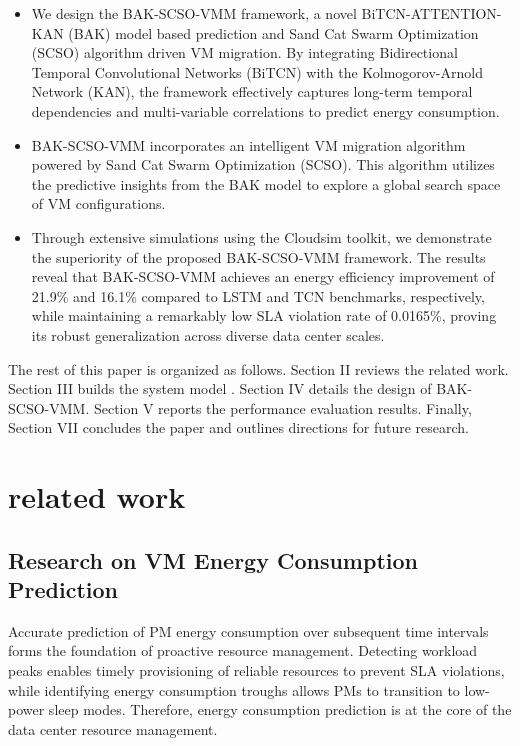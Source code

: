 \documentclass[conference]{{IEEEtran}}
\begin{document}
\begin{itemize}
    \item  We design the BAK-SCSO-VMM framework, a novel BiTCN-ATTENTION-KAN (BAK) model based prediction and Sand Cat Swarm Optimization (SCSO) algorithm driven VM migration. By integrating Bidirectional Temporal Convolutional Networks (BiTCN) with the Kolmogorov-Arnold Network (KAN), the framework effectively captures long-term temporal dependencies and multi-variable correlations to predict energy consumption.

    \item  BAK-SCSO-VMM incorporates an intelligent VM migration algorithm powered by Sand Cat Swarm Optimization (SCSO). This algorithm utilizes the predictive insights from the BAK model to explore a global search space of VM configurations.

    \item  Through extensive simulations using the Cloudsim toolkit, we demonstrate the superiority of the proposed BAK-SCSO-VMM framework. The results reveal that BAK-SCSO-VMM achieves an energy efficiency improvement of 21.9\% and 16.1\% compared to LSTM and TCN benchmarks, respectively, while maintaining a remarkably low SLA violation rate of 0.0165\%, proving its robust generalization across diverse data center scales.
\end{itemize}

The rest of this paper is organized as follows. Section II reviews the related work. Section III builds the system model . Section IV details the design of BAK-SCSO-VMM. Section V reports the performance evaluation results. Finally, Section VII concludes the paper and outlines directions for future research.

\section{related work}
\subsection{Research on VM Energy Consumption Prediction}

Accurate prediction of PM energy consumption over subsequent time intervals forms the foundation of proactive resource management. Detecting workload peaks enables timely provisioning of reliable resources to prevent SLA violations\cite{ranganna2024fitness}\cite{chua2024building}, while identifying energy consumption troughs allows PMs to transition to low-power sleep modes\cite{altahat2025virtual}. Therefore, energy consumption prediction is at the core of the data center resource management.
\end{document}

